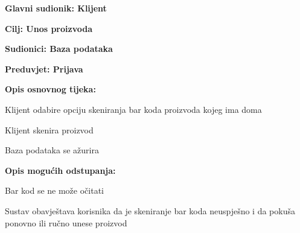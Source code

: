 					
					\noindent {}
					\begin{packed_item}
	
						\item \textbf{Glavni sudionik: Klijent}
						\item  \textbf{Cilj: Unos proizvoda }
						\item  \textbf{Sudionici: Baza podataka}
						\item  \textbf{Preduvjet: Prijava } 
						\item  \textbf{Opis osnovnog tijeka:}
						
						\item[] \begin{packed_enum}
	
							\item Klijent odabire opciju skeniranja bar koda proizvoda kojeg ima doma
							\item Klijent skenira proizvod
							\item Baza podataka se ažurira
						\end{packed_enum}

					\item  \textbf{Opis mogućih odstupanja:}
						
						\item[] \begin{packed_item}
	
							\item[2.a] Bar kod se ne može očitati
							\item[] \begin{packed_enum}
								
								\item Sustav obavještava korisnika da je skeniranje bar koda neuspješno i da pokuša ponovno ili ručno unese proizvod	
							\end{packed_enum}
						\end{packed_item}
					\end{packed_item}
					
